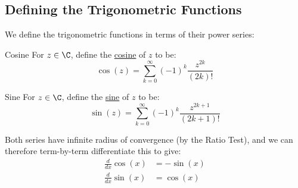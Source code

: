 \documentclass[../Main.tex]{subfiles}
\begin{document}
\subsection{Defining the Trigonometric Functions}
We define the trigonometric functions in terms of their power series:
\begin{definition}{Cosine}
    For $z \in \C$, define the \underline{cosine} of $z$ to be:
    \begin{equation*}
        \cos(z) = \sum_{k = 0}^\infty (-1)^k \frac{z^{2k}}{(2k)!}
    \end{equation*}
\end{definition}
\begin{definition}{Sine}
    For $z \in \C$, define the \underline{sine} of $z$ to be:
    \begin{equation*}
        \sin(z) = \sum_{k = 0}^\infty (-1)^k \frac{z^{2k+1}}{(2k+1)!}
    \end{equation*}
\end{definition}
Both series have infinite radius of convergence (by the Ratio Test), and we can therefore term-by-term differentiate this to give:
\begin{align*}
    \frac{d}{dx} \cos(x) &= -\sin(x) \\
    \frac{d}{dx} \sin(x) &= \cos(x) \\
\end{align*}
\end{document}
